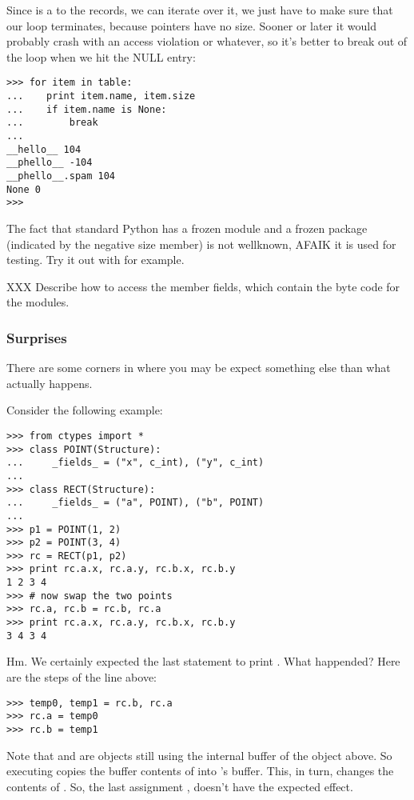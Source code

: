 Since  is a  to the  records, we
can iterate over it, we just have to make sure that our loop
terminates, because pointers have no size. Sooner or later it would
probably crash with an access violation or whatever, so it's better to
break out of the loop when we hit the NULL entry:
\begin{verbatim}
>>> for item in table:
...    print item.name, item.size
...    if item.name is None:
...        break
...
__hello__ 104
__phello__ -104
__phello__.spam 104
None 0
>>>
\end{verbatim}

The fact that standard Python has a frozen module and a frozen package
(indicated by the negative size member) is not wellknown, AFAIK it is
used for testing. Try it out with  for example.

XXX Describe how to access the  member fields, which contain
the byte code for the modules.


\subsubsection{Surprises\label{ctypes-surprises}}

There are some corners in  where you may be expect something
else than what actually happens.

Consider the following example:
\begin{verbatim}
>>> from ctypes import *
>>> class POINT(Structure):
...     _fields_ = ("x", c_int), ("y", c_int)
...
>>> class RECT(Structure):
...     _fields_ = ("a", POINT), ("b", POINT)
...
>>> p1 = POINT(1, 2)
>>> p2 = POINT(3, 4)
>>> rc = RECT(p1, p2)
>>> print rc.a.x, rc.a.y, rc.b.x, rc.b.y
1 2 3 4
>>> # now swap the two points
>>> rc.a, rc.b = rc.b, rc.a
>>> print rc.a.x, rc.a.y, rc.b.x, rc.b.y
3 4 3 4
\end{verbatim}

Hm. We certainly expected the last statement to print .
What happended? Here are the steps of the 
line above:
\begin{verbatim}
>>> temp0, temp1 = rc.b, rc.a
>>> rc.a = temp0
>>> rc.b = temp1
\end{verbatim}

Note that  and  are objects still using the internal
buffer of the  object above. So executing 
copies the buffer contents of  into  's buffer.  This,
in turn, changes the contents of . So, the last assignment
, doesn't have the expected effect.

